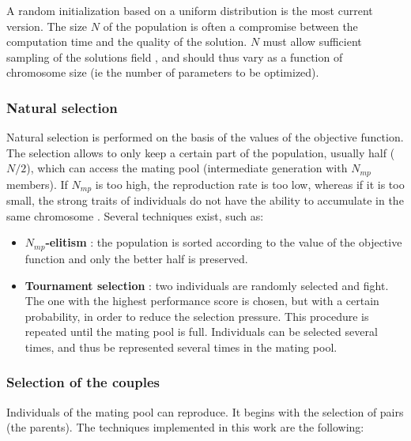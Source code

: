 \documentclass[twocol]{ametsoc}
\begin{document}
A random initialization based on a uniform distribution is the most current version. The size $N$ of the population is often a compromise between the computation time and the quality of the solution. $N$ must allow sufficient sampling of the solutions field \citep{Beasley1996a}, and should thus vary as a function of chromosome size (ie the number of parameters to be optimized). 


\subsubsection{Natural selection}

Natural selection is performed on the basis of the values of the objective function. The selection allows to only keep a certain part of the population, usually half ($N/2$), which can access the mating pool (intermediate generation with $N_{mp}$ members). If $N_{mp}$ is too high, the reproduction rate is too low, whereas if it is too small, the strong traits of individuals do not have the ability to accumulate in the same chromosome \citep{Haupt2004}. Several techniques exist, such as:

\begin{itemize}
	\item \textbf{$N_{mp}$-elitism} \citep{Michalewicz1996}: the population is sorted according to the value of the objective function and only the better half is preserved. 
	
	\item \textbf{Tournament selection} \citep{Michalewicz1996, Zitzler2004a}: two individuals are randomly selected and fight. The one with the highest performance score is chosen, but with a certain probability, in order to reduce the selection pressure. This procedure is repeated until the mating pool is full. Individuals can be selected several times, and thus be represented several times in the mating pool.
\end{itemize}


\subsubsection{Selection of the couples}

Individuals of the mating pool can reproduce. It begins with the selection of pairs (the parents). The techniques implemented in this work are the following:
\end{document}
